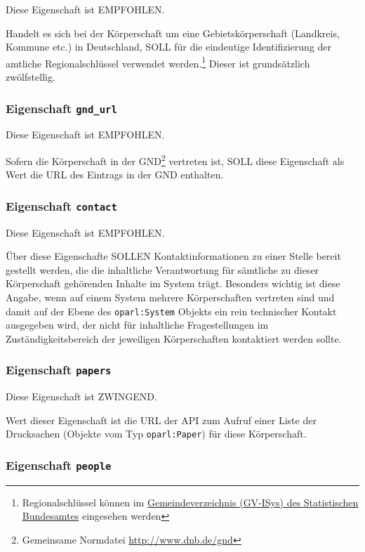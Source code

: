 \documentclass[,a4paper]{article}
\begin{document}
Diese Eigenschaft ist EMPFOHLEN.

Handelt es sich bei der Körperschaft um eine Gebietskörperschaft
(Landkreis, Kommune etc.) in Deutschland, SOLL für die eindeutige
Identifizierung der amtliche Regionalschlüssel verwendet
werden.\footnote{Regionalschlüssel können im
  \href{https://www.destatis.de/DE/ZahlenFakten/LaenderRegionen/Regionales/Gemeindeverzeichnis/Gemeindeverzeichnis.html}{Gemeindeverzeichnis
  (GV-ISys) des Statistischen Bundesamtes} eingesehen werden} Dieser ist
grundsätzlich zwölfstellig.

\subsubsection{Eigenschaft \texttt{gnd\_url}}

Diese Eigenschaft ist EMPFOHLEN.

Sofern die Körperschaft in der GND\footnote{Gemeinsame Normdatei
  \url{http://www.dnb.de/gnd}} vertreten ist, SOLL diese Eigenschaft als
Wert die URL des Eintrags in der GND enthalten.

\subsubsection{Eigenschaft \texttt{contact}}

Diese Eigenschaft ist EMPFOHLEN.

Über diese Eigenschafte SOLLEN Kontaktinformationen zu einer Stelle
bereit gestellt werden, die die inhaltliche Verantwortung für sämtliche
zu dieser Körperschaft gehörenden Inhalte im System trägt. Besonders
wichtig ist diese Angabe, wenn auf einem System mehrere Körperschaften
vertreten sind und damit auf der Ebene des \texttt{oparl:System} Objekts
ein rein technischer Kontakt ausgegeben wird, der nicht für inhaltliche
Fragestellungen im Zuständigkeitsbereich der jeweiligen Körperschaften
kontaktiert werden sollte.

\subsubsection{Eigenschaft \texttt{papers}}

Diese Eigenschaft ist ZWINGEND.

Wert dieser Eigenschaft ist die URL der API zum Aufruf einer Liste der
Drucksachen (Objekte vom Typ \texttt{oparl:Paper}) für diese
Körperschaft.

\subsubsection{Eigenschaft \texttt{people}}
\end{document}
